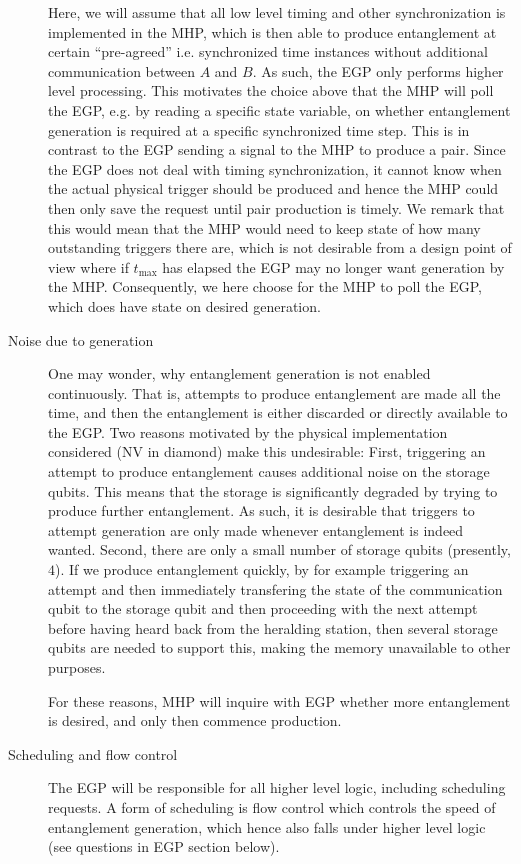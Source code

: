\documentclass{article}
\begin{document}
\begin{description}
Here, we will assume that all low level timing and other synchronization is implemented in the MHP, which is then able to produce entanglement
at certain ``pre-agreed'' i.e. synchronized 
time instances without additional communication between $A$ and $B$. As such, the EGP only performs higher level processing.
This motivates the choice above that the MHP will poll the EGP, e.g. by reading a specific state variable, on whether entanglement generation is required at a specific synchronized time step. This is in contrast to the EGP sending a signal to the MHP to produce a pair. Since the EGP does not deal with timing synchronization, 
it cannot know when the actual physical trigger should be produced and hence the MHP could then only save the request until pair production is timely. 
We remark that this would mean that the MHP would need to keep state 
of how many outstanding triggers there are, which is not desirable from a design point of view where if $t_{\max}$ has elapsed the EGP may no longer want generation by the MHP. Consequently, we here choose for the MHP to poll the EGP, which does have state on desired generation.

\item[Noise due to generation]
One may wonder, why entanglement generation is not enabled continuously. That is, attempts to produce entanglement are made all the time, and then
the entanglement is either discarded or directly available to the EGP.
Two reasons motivated by the physical implementation considered (NV in diamond) make this undesirable:
First, triggering an attempt to produce entanglement causes additional noise on the storage qubits. This means that the storage is significantly degraded
by trying to produce further entanglement. As such, it is desirable that triggers to attempt generation are only made whenever entanglement is indeed wanted.
Second, there are only a small number of storage qubits (presently, $4$). If we produce entanglement quickly, by for example triggering an attempt and then immediately transfering the state of the communication qubit to the storage qubit and then proceeding with the next attempt before having heard back from the heralding station, 
then several storage qubits are needed to support this, making the memory unavailable to other purposes.

For these reasons, MHP will inquire with EGP whether more entanglement is desired, and only then commence production.

\item[Scheduling and flow control]
The EGP will be responsible for all higher level logic, including scheduling requests. A form of scheduling
is flow control which controls the speed of entanglement generation, which hence also falls under higher level logic
(see questions in EGP section below). 


\end{description}
\end{document}
